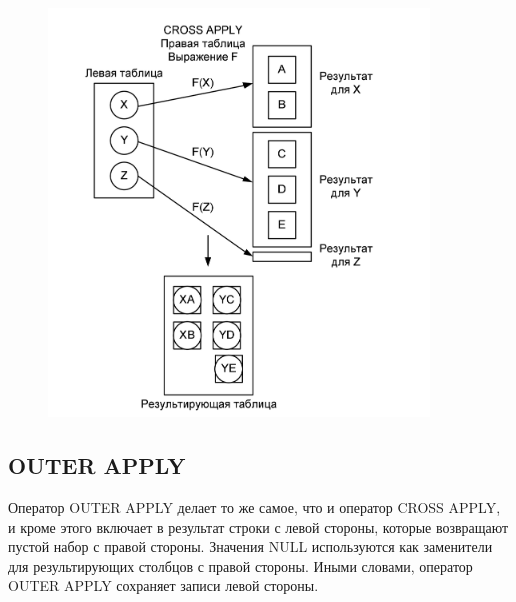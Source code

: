 \begin{figure}[h!]
	\begin{center}
		\includegraphics[width=0.9\textwidth]{img/crossapply.png}
	\end{center}
	\captionsetup{justification=centering}
\end{figure}


\subsection{OUTER APPLY}

Оператор OUTER APPLY делает то же самое, что и оператор CROSS APPLY, и кроме этого включает в результат строки с левой стороны, которые возвращают пустой набор
с правой стороны. Значения NULL используются как заменители для результирующих столбцов с правой стороны. Иными словами, оператор OUTER APPLY сохраняет
записи левой стороны.


